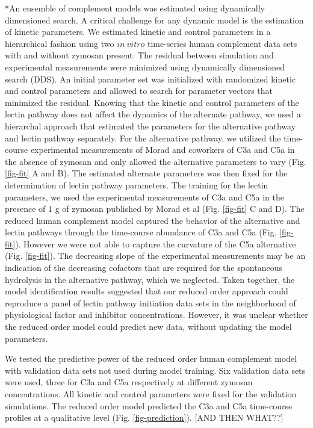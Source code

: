 \documentclass[12pt]{article}
\makeatletter
\renewcommand\subsection{\@startsection
	{subsection}{2}{0mm}
	{-0.05in}
	{-0.5\baselineskip}
	{\normalfont\normalsize\bfseries}}
\makeatother
\begin{document}
\subsection*{An ensemble of complement models was estimated using dynamically dimensioned search.}
A critical challenge for any dynamic model is the estimation of kinetic parameters. We estimated
kinetic and control parameters in a hierarchical fashion using  two $in~vitro$ time-series human complement data sets with and without zymosan present. The residual between simulation and experimental measurements were minimized  using dynamically dimensioned search (DDS). An initial parameter set was initialized with randomized kinetic and control parameters and allowed to search for parameter vectors that minimized the residual. Knowing that the kinetic and control parameters of the lectin pathway does not affect the dynamics of the alternate pathway, we used a hierarchal approach that estimated the parameters for the alternative pathway and lectin pathway separately. For the alternative pathway, we utilized the time-course experimental measurements of Morad and coworkers \cite{morad2015time} of C3a and C5a in the absence of zymosan and only allowed the alternative parameters to vary (Fig. \ref{fig-fit} A and B). The estimated alternate parameters was then fixed for the determination of lectin pathway parameters. The training for the lectin parameters, we used the experimental measurements of C3a and C5a in the presence of $1$ g of zymosan published by Morad et al \cite{morad2015time} (Fig. \ref{fig-fit} C and D).
The reduced human complement model captured the behavior of the alternative and lectin pathways through the time-course abundance of C3a and C5a (Fig. \ref{fig-fit}).
However we were not able to capture the curvature of the C5a alternative (Fig. \ref{fig-fit}).
The decreasing slope of the experimental measurements may be an indication of the decreasing cofactors that are required for the spontaneous hydrolysis in the alternative pathway, which we neglected.  Taken together, the model identification results suggested that our reduced order approach could reproduce a panel of lectin pathway initiation data sets in the neighborhood of physiological factor and inhibitor concentrations. However, it was unclear whether the reduced order model could predict new data, without updating the model parameters.

We tested the predictive power of the reduced order human complement model with validation data sets not used during model training. Six validation data sets were used, three for C3a and C5a respectively at different zymosan concentrations. All kinetic and control parameters were
fixed for the validation simulations. The reduced order model predicted the C3a and C5a time-course profiles at a qualitative level (Fig. \ref{fig-prediction}). [AND THEN WHAT??]
\end{document}
